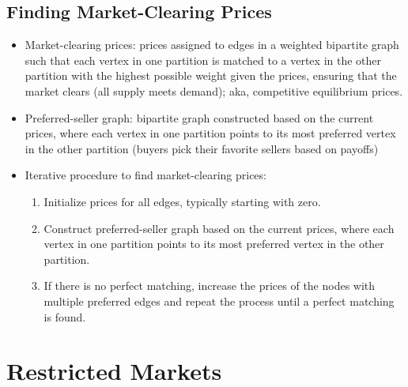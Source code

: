 \subsection{Finding Market-Clearing Prices}

\begin{itemize}
    \item Market-clearing prices: prices assigned to edges in a weighted bipartite graph such that each vertex in one partition is matched to a vertex in the other partition with the highest possible weight given the prices, ensuring that the market clears (all supply meets demand); aka, competitive equilibrium prices.
    \item Preferred-seller graph: bipartite graph constructed based on the current prices, where each vertex in one partition points to its most preferred vertex in the other partition (buyers pick their favorite sellers based on payoffs)
    \item Iterative procedure to find market-clearing prices:
          \begin{enumerate}
              \item Initialize prices for all edges, typically starting with zero.
              \item Construct preferred-seller graph based on the current prices, where each vertex in one partition points to its most preferred vertex in the other partition.
              \item If there is no perfect matching, increase the prices of the nodes with multiple preferred edges and repeat the process until a perfect matching is found.
          \end{enumerate}
\end{itemize}

\section{Restricted Markets}

